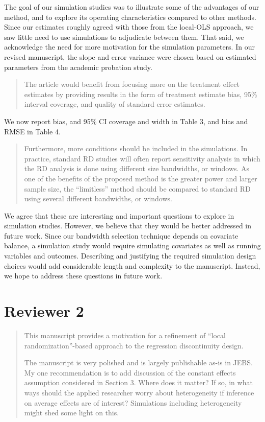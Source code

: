 \documentclass[12pt]{article}
\begin{document}
The goal of our simulation studies was to illustrate some of the
advantages of our method, and to explore its operating characteristics
compared to other methods. Since our estimates roughly agreed with
those from the local-OLS approach, we saw little need to use
simulations to adjudicate between them. That said, we acknowledge the
need for more motivation for the simulation parameters. In our revised
manuscript, the slope and error variance were chosen based on
estimated parameters from the academic probation study.

\begin{quote}
The article would benefit from focusing more on the treatment effect
estimates by providing results in the form of treatment estimate bias,
95\% interval coverage, and quality of standard error estimates.
\end{quote}
We now report bias, and 95\% CI coverage and width in Table 3, and
bias and RMSE in Table 4.

\begin{quote}
Furthermore, more conditions should be included in the simulations. In
practice, standard RD studies will often report sensitivity analysis
in which the RD analysis is done using different size bandwidths, or
windows. As one of the benefits of the proposed method is the greater
power and larger sample size, the “limitless” method should be
compared to standard RD using several different bandwidths, or
windows.
\end{quote}

We agree that these are interesting and important questions to explore
in simulation studies. However, we believe that they would be better
addressed in future work. Since our bandwidth selection technique depends on
covariate balance, a simulation study would require simulating
covariates as well as running variables and outcomes. Describing and
justifying the required simulation design choices would
add considerable length and complexity to the manuscript.
Instead, we hope to address these questions in future work.

\section{Reviewer 2}

\begin{quote}
This manuscript provides a motivation for a refinement of ``local randomization''-based approach to the regression discontinuity design.

The manuscript is very polished and is largely publishable as-is in JEBS. My one recommendation is to add discussion of the constant effects assumption considered in Section 3. Where does it matter? If so, in what ways should the applied researcher worry about heterogeneity if inference on average effects are of interest? Simulations including heterogeneity might shed some light on this.
\end{quote}
\end{document}

